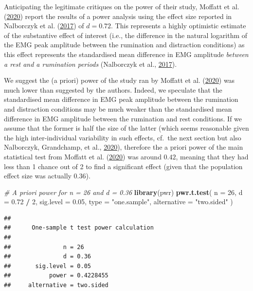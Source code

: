 \documentclass[
  english,
  man, donotrepeattitle,floatsintext]{apa6}
\newenvironment{Shaded}{\begin{snugshade}}{\end{snugshade}}
\newcommand{\CommentTok}[1]{\textcolor[rgb]{0.56,0.35,0.01}{\textit{#1}}}
\newcommand{\DataTypeTok}[1]{\textcolor[rgb]{0.13,0.29,0.53}{#1}}
\newcommand{\DecValTok}[1]{\textcolor[rgb]{0.00,0.00,0.81}{#1}}
\newcommand{\FloatTok}[1]{\textcolor[rgb]{0.00,0.00,0.81}{#1}}
\newcommand{\KeywordTok}[1]{\textcolor[rgb]{0.13,0.29,0.53}{\textbf{#1}}}
\newcommand{\NormalTok}[1]{#1}
\newcommand{\OperatorTok}[1]{\textcolor[rgb]{0.81,0.36,0.00}{\textbf{#1}}}
\newcommand{\StringTok}[1]{\textcolor[rgb]{0.31,0.60,0.02}{#1}}
\begin{document}
Anticipating the legitimate critiques on the power of their study, Moffatt et al. (\protect\hyperlink{ref-moffatt_inner_2020}{2020}) report the results of a power analysis using the effect size reported in Nalborczyk et al. (\protect\hyperlink{ref-nalborczyk_orofacial_2017}{2017}) of \(d = 0.72\). This represents a highly optimistic estimate of the substantive effect of interest (i.e., the difference in the natural logarithm of the EMG peak amplitude between the rumination and distraction conditions) as this effect represents the standardised mean difference in EMG amplitude \emph{between a rest and a rumination periods} (Nalborczyk et al., \protect\hyperlink{ref-nalborczyk_orofacial_2017}{2017}).

We suggest the (a priori) power of the study ran by Moffatt et al. (\protect\hyperlink{ref-moffatt_inner_2020}{2020}) was much lower than suggested by the authors. Indeed, we speculate that the standardised mean difference in EMG peak amplitude between the rumination and distraction conditions may be much weaker than the standardised mean difference in EMG amplitude between the rumination and rest conditions. If we assume that the former is half the size of the latter (which seems reasonable given the high inter-individual variability in such effects, cf.~the next section but also Nalborczyk, Grandchamp, et al., \protect\hyperlink{ref-nalborczyk_can_2020}{2020}), therefore the a priori power of the main statistical test from Moffatt et al. (\protect\hyperlink{ref-moffatt_inner_2020}{2020}) was around \(0.42\), meaning that they had less than 1 chance out of 2 to find a significant effect (given that the population effect size was actually \(0.36\)).

\begin{Shaded}
\begin{Highlighting}[]
\CommentTok{\# A priori power for n = 26 and d = 0.36}
\KeywordTok{library}\NormalTok{(pwr)}
\KeywordTok{pwr.t.test}\NormalTok{(}
  \DataTypeTok{n =} \DecValTok{26}\NormalTok{, }\DataTypeTok{d =} \FloatTok{0.72} \OperatorTok{/}\StringTok{ }\DecValTok{2}\NormalTok{, }\DataTypeTok{sig.level =} \FloatTok{0.05}\NormalTok{,}
  \DataTypeTok{type =} \StringTok{"one.sample"}\NormalTok{, }\DataTypeTok{alternative =} \StringTok{"two.sided"}
\NormalTok{  )}
\end{Highlighting}
\end{Shaded}

\begin{verbatim}
## 
##      One-sample t test power calculation 
## 
##               n = 26
##               d = 0.36
##       sig.level = 0.05
##           power = 0.4228455
##     alternative = two.sided
\end{verbatim}
\end{document}

